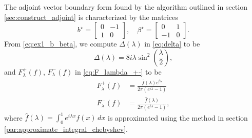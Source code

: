 \documentclass[12pt, oneside, a4paper]{article}
\begin{document}
The adjoint vector boundary form found by the algorithm outlined in section \ref{sec:construct_adjoint} is characterized by the matrices
\begin{equation}\label{eq:ex1_b_beta}
    b^\star = \begin{bmatrix}0&-1\\ 1&0\end{bmatrix}, \quad \beta^\star = \begin{bmatrix}0&1\\ -1&0\end{bmatrix}.
\end{equation}
From \eqref{eq:ex1_b_beta}, we compute $\Delta(\lambda)$ in \eqref{eq:delta} to be 
\begin{equation}\label{eq:ex1_delta}
    \Delta(\lambda) = 8i\lambda \sin^2\left(\frac{\lambda}{2}\right),
\end{equation}
and $F_\lambda^+(f)$, $F_\lambda^-(f)$ in \eqref{eq:F_lambda_+-} to be
\begin{subequations}\label{eq:ex1_F_lambda_+-}
    \begin{align}
        F_\lambda^+(f) &= \frac{\hat{f}(\lambda)e^{i\lambda}}{2\pi(e^{i\lambda}-1)}\\
    F_\lambda^-(f) &= \frac{\hat{f}(\lambda)}{2\pi(e^{i\lambda}-1)},
    \end{align}
\end{subequations}
where 
$\hat{f}(\lambda)=\int_0^1 e^{i\lambda x}f(x)\,dx$ is approximated using the method in section \ref{par:approximate_integral_chebyshev}.
\end{document}
